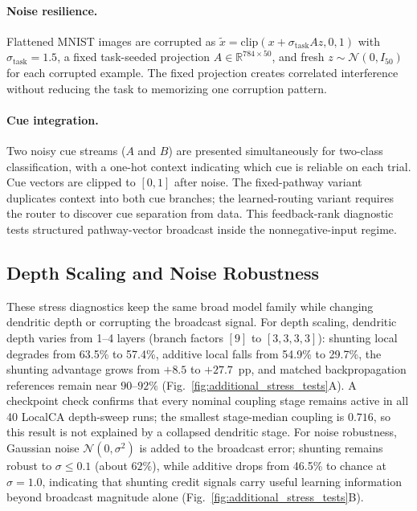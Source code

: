     \paragraph{Noise resilience.}
    Flattened MNIST images are corrupted as $\tilde{x}=\mathrm{clip}(x+\sigma_{\mathrm{task}}Az,0,1)$ with $\sigma_{\mathrm{task}}=1.5$, a fixed task-seeded projection $A\in\mathbb{R}^{784\times50}$, and fresh $z\sim\mathcal{N}(0,I_{50})$ for each corrupted example. The fixed projection creates correlated interference without reducing the task to memorizing one corruption pattern.
    
    \paragraph{Cue integration.}
    Two noisy cue streams ($A$ and $B$) are presented simultaneously for two-class classification, with a one-hot context indicating which cue is reliable on each trial. Cue vectors are clipped to $[0,1]$ after noise. The fixed-pathway variant duplicates context into both cue branches; the learned-routing variant requires the router to discover cue separation from data. This feedback-rank diagnostic tests structured pathway-vector broadcast inside the nonnegative-input regime.
    
    \subsection{Depth Scaling and Noise Robustness}
    These stress diagnostics keep the same broad model family while changing dendritic depth or corrupting the broadcast signal. For depth scaling, dendritic depth varies from 1--4 layers (branch factors $[9]$ to $[3,3,3,3]$): shunting local degrades from 63.5\% to 57.4\%, additive local falls from 54.9\% to 29.7\%, the shunting advantage grows from $+8.5$ to $+27.7$~pp, and matched backpropagation references remain near $90$--$92\%$ (Fig.~\ref{fig:additional_stress_tests}A). A checkpoint check confirms that every nominal coupling stage remains active in all 40 LocalCA depth-sweep runs; the smallest stage-median coupling is $0.716$, so this result is not explained by a collapsed dendritic stage. For noise robustness, Gaussian noise $\mathcal{N}(0,\sigma^2)$ is added to the broadcast error; shunting remains robust to $\sigma\!\leq\!0.1$ (about $62\%$), while additive drops from 46.5\% to chance at $\sigma{=}1.0$, indicating that shunting credit signals carry useful learning information beyond broadcast magnitude alone (Fig.~\ref{fig:additional_stress_tests}B).
    
